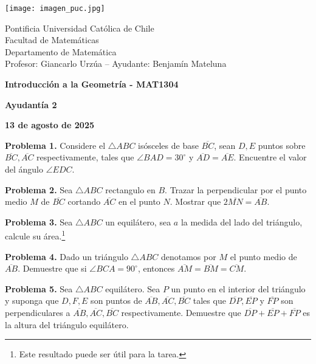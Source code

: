 \documentclass{article}
\begin{document}
\begin{minipage}{2.5cm}
    \texttt{[image: imagen\_puc.jpg]}
\end{minipage}
\begin{minipage}{14cm}
    {\sc Pontificia Universidad Católica de Chile\\
    Facultad de Matemáticas\\
    Departamento de Matemática\\
    Profesor: Giancarlo Urzúa -- Ayudante: Benjamín Mateluna}
\end{minipage}
\vspace{1ex}

{\centerline{\bf Introducción a la Geometría - MAT1304}
\centerline{\bf Ayudantía 2}}
\centerline{\bf 13 de agosto de 2025}

\vspace{1cm}
\noindent\textbf{Problema 1.} Considere el $\triangle ABC$ isósceles de base $\overline{BC}$, sean
$D,E$ puntos sobre $\overline{BC},\overline{AC}$ respectivamente, tales que 
$\angle BAD=30^{\circ}$ y $\overline{AD}=\overline{AE}$. Encuentre el valor del ángulo 
$\angle EDC$.

\vspace{5mm}
\noindent\textbf{Problema 2.} Sea $\triangle ABC$ rectangulo en $B$. Trazar la perpendicular por
el punto medio $M$ de $\overline{BC}$ cortando $\overline{AC}$ en el punto $N$. Mostrar que 
$2\overline{MN}=\overline{AB}$.

\vspace{5mm}
\noindent\textbf{Problema 3.} Sea $\triangle ABC$ un equilátero, sea $a$ la medida del
lado del triángulo, calcule su área.\footnote{Este resultado puede ser útil para la tarea.}

\vspace{5mm}
\noindent\textbf{Problema 4.} Dado un triángulo $\triangle ABC$ denotamos por $M$ el punto medio
de $\overline{AB}$. Demuestre que si $\angle BCA=90^{\circ}$, entonces 
$\overline{AM}=\overline{BM}=\overline{CM}$.

\vspace{5mm}
\noindent\textbf{Problema 5.} Sea $\triangle ABC$ equilátero. Sea $P$ un punto en el interior del
triángulo y suponga que $D,F,E$ son puntos de $\overline{AB},\overline{AC},\overline{BC}$ tales 
que $\overline{DP},\overline{EP}$ y $\overline{FP}$ son perpendiculares a 
$\overline{AB},\overline{AC},\overline{BC}$ respectivamente. Demuestre que 
$\overline{DP}+\overline{EP}+\overline{FP}$ es la altura del triángulo equilátero.

\end{document}
